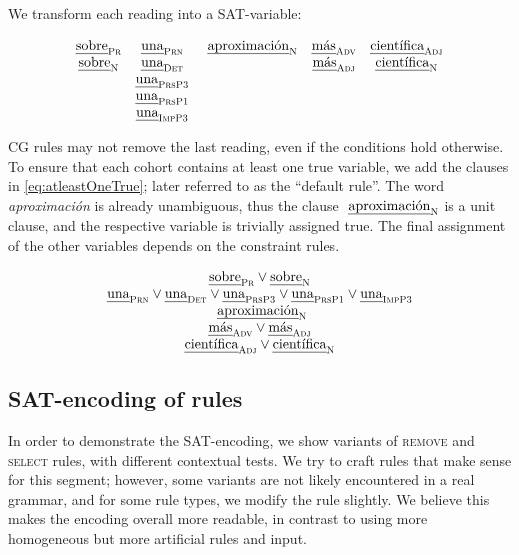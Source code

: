 \noindent We transform each reading into a SAT-variable:

\begin{equation}
\begin{array}{c c c c c}
\sobrePr & \unaPrn & \aproximacionN & \masAdv & \cientificaAdj \\
\sobreN  & \unaDet &                & \masAdj & \cientificaN \\
         & \unaPrsPThree \\
         & \unaPrsPOne \\
         & \unaImp \\
\end{array}
\end{equation}

CG rules may not remove the last reading, even if the conditions hold otherwise.
To ensure that each cohort contains at least one true variable, we add the clauses in \ref{eq:atleastOneTrue}; later referred to as the ``default rule''. 
The word \emph{aproximación} is already unambiguous, thus the clause $\text{ \em aproximaci\'{o}n}_{\text{\sc N}}$ is a unit clause, and the respective variable is trivially assigned true. 
The final assignment of the other variables depends on the constraint rules.


\begin{equation}
\begin{array}{c}
\sobrePr \vee \sobreN \\
\unaPrn \vee \unaDet \vee \unaPrsPThree \vee \unaPrsPOne \vee \unaImp \\
\aproximacionN \\
\masAdv \vee \masAdj \\
\cientificaAdj \vee \cientificaN \\
\end{array}
\label{eq:atleastOneTrue}
\end{equation}


\subsection{SAT-encoding of rules}
\label{appendix1}

In order to demonstrate the SAT-encoding, we show variants of \textsc{remove} and \textsc{select} rules, with different contextual tests. 
We try to craft rules that make sense for this segment; however, some variants are not likely encountered in a real grammar, and for some rule types, we modify the rule slightly. We believe this makes the encoding overall more readable, in contrast to using more homogeneous but more artificial rules and input.

